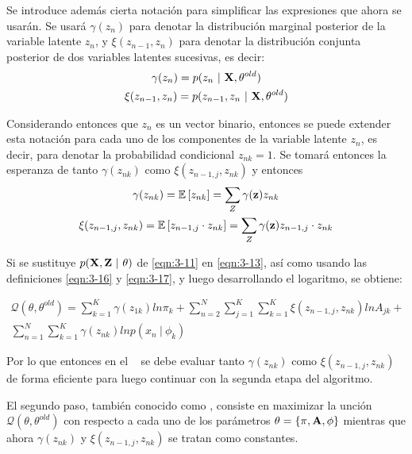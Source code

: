 Se introduce además cierta notación para simplificar las expresiones que ahora se usarán. Se usará $\gamma(z_n)$ para denotar la distribución marginal posterior de la variable latente $z_n$, y $\xi(z_{n-1}, z_n)$ para denotar la distribución conjunta posterior de dos variables latentes sucesivas, es decir: 
\begin{gather}
\gamma(z_n) = p(z_n ~|~ \textbf{X}, \theta^{old}) \label{eqn:3-14} \\
\xi(z_{n-1}, z_n) = p(z_{n-1}, z_n ~|~ \textbf{X}, \theta^{old}) \label{eqn:3-15}
\end{gather}

Considerando entonces que $z_n$ es un vector binario, entonces se puede extender esta notación para cada uno de los 
componentes de la variable latente $z_n$, es decir, para denotar la probabilidad condicional $z_{nk} = 1$. Se
tomará entonces la esperanza de tanto $\gamma(z_{nk})$ como $\xi(z_{n-1, j}, z_{nk})$ y entonces
\begin{gather}
\gamma(z_{nk}) = \mathbb{E} \left[ z_{nk} \right] = \sum_Z  \gamma(\textbf{z}) z_{nk} \label{eqn:3-16} \\
\xi(z_{n-1,j}, z_{nk}) = \mathbb{E} \left[z_{n-1, j} \cdot z_{nk} \right] = \sum_Z  \gamma(\textbf{z}) z_{n-1, j} 
\cdot z_{nk}
\label{eqn:3-17}
\end{gather}

Si se sustituye $p(\textbf{X}, \textbf{Z} ~|~ \theta)$ de \eqref{eqn:3-11} en \eqref{eqn:3-13}, así como usando
las definiciones \eqref{eqn:3-16} y \eqref{eqn:3-17}, y luego desarrollando el logaritmo, se obtiene: 

\begin{equation}
\begin{split}
\mathcal{Q}(\theta, \theta^{old}) = 
  \sum_{k=1}^K \gamma(z_{1k}) ln \pi_k + 
  \sum_{n=2}^N \sum_{j=1}^K \sum_{k=1}^K \xi(z_{n-1,j}, z_{nk}) ln A_{jk} + \\
  \sum_{n=1}^N \sum_{k=1}^K \gamma(z_{nk}) ln p(x_n ~|~ \phi_k)
\label{eqn:3-18}
\end{split}
\end{equation}

Por lo que entonces en el \estep~ se debe evaluar tanto $\gamma(z_{nk})$ como $\xi(z_{n-1,j}, z_{nk})$ de forma eficiente para luego continuar con la segunda etapa del algoritmo.

El segundo paso, también conocido como \mstep, consiste en maximizar la unción $\mathcal{Q}(\theta, \theta^{old})$ con respecto a cada uno de los parámetros $\theta = \lbrace \pi, \textbf{A}, \phi \rbrace$ mientras que ahora $\gamma(z_{nk})$ y $\xi(z_{n-1,j}, z_{nk})$ se tratan como constantes.


